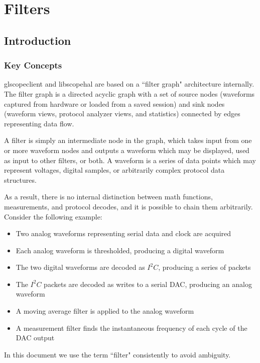 \chapter{Filters}

\section{Introduction}

\subsection{Key Concepts}

glscopeclient and libscopehal are based on a ``filter graph" architecture internally. The filter graph is a directed
acyclic graph with a set of source nodes (waveforms captured from hardware or loaded from a saved session) and sink
nodes (waveform views, protocol analyzer views, and statistics) connected by edges representing data flow.

A filter is simply an intermediate node in the graph, which takes input from one or more waveform nodes and outputs a
waveform which may be displayed, used as input to other filters, or both. A waveform is a series of data points which
may represent voltages, digital samples, or arbitrarily complex protocol data structures.

As a result, there is no internal distinction between math functions, measurements, and protocol decodes, and it is
possible to chain them arbitrarily. Consider the following example:

\begin{itemize}
\item Two analog waveforms representing serial data and clock are acquired
\item Each analog waveform is thresholded, producing a digital waveform
\item The two digital waveforms are decoded as $I^2C$, producing a series of packets
\item The $I^2C$ packets are decoded as writes to a serial DAC, producing an analog waveform
\item A moving average filter is applied to the analog waveform
\item A measurement filter finds the instantaneous frequency of each cycle of the DAC output
\end{itemize}

In this document we use the term ``filter" consistently to avoid ambiguity.

